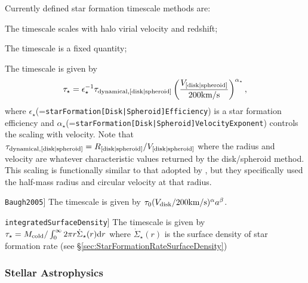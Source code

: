 Currently defined star formation timescale methods are:
\begin{description}
 \item [\hyperlink{star_formation.timescales.disks.halo_scaling.F90:star_formation_timescale_disks_halo_scaling}{{\tt haloScaling}}]  The timescale scales with halo virial velocity and redshift;
 \item [\hyperlink{star_formation.timescales.disks.fixed.F90:star_formation_timescale_disks_fixed}{{\tt fixed}}]  The timescale is a fixed quantity;
 \item [\hyperlink{star_formation.timescales.disks.dynamical_time.F90:star_formation_timescale_disks_dynamical_time:star_formation_timescale_disk_dynamical_time}{{\tt dynamicalTime}}]  The timescale is given by
\begin{equation}
 \tau_\star = \epsilon_\star^{-1} \tau_{\rm dynamical, [disk|spheroid]} \left( {V_{\rm [disk|spheroid]} \over 200\hbox{km/s}} \right)^{\alpha_\star},
\end{equation}
where $\epsilon_\star$(={\tt starFormation[Disk|Spheroid]Efficiency}) is a star formation efficiency and $\alpha_\star$(={\tt starFormation[Disk|Spheroid]VelocityExponent}) controls the scaling with velocity. Note that $\tau_{\rm dynamical,[disk|spheroid]}=R_{\rm [disk|spheroid]}/V_{\rm [disk|spheroid]}$ where the radius and velocity are whatever characteristic values returned by the disk/spheroid method. This scaling is functionally similar to that adopted by \cite{cole_hierarchical_2000}, but they specifically used the half-mass radius and circular velocity at that radius.
 \item {\tt Baugh2005}] The timescale is given by $\tau_0 (V_{\rm disk}/200\hbox{km/s})^\alpha a^\beta$.
 \item {\tt integratedSurfaceDensity}] The timescale is given by $\tau_\star = M_{\rm cold}/\int_0^\infty 2 \pi r \dot{\Sigma}_\star(r) {\rm d}r$ where $\dot{\Sigma}_\star(r)$ is the surface density of star formation rate (see \S\ref{sec:StarFormationRateSurfaceDensity})
\end{description}

\subsubsection{Stellar Astrophysics}

